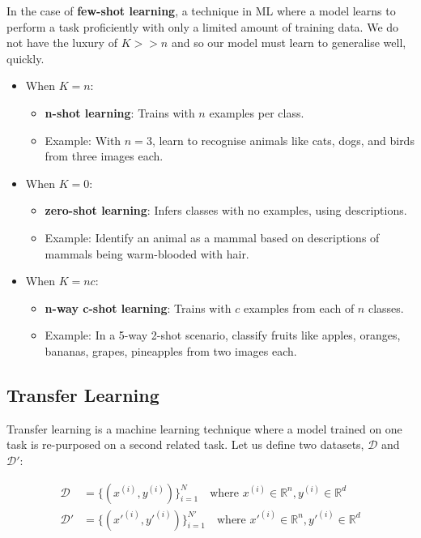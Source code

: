 In the case of \textbf{few-shot learning}, a technique in ML where a model learns to perform a task proficiently with only a limited amount of training data. We do not have the luxury of $K >> n$ and so our model must learn to generalise well, quickly. 


\begin{itemize}[noitemsep]
    \item When $K = n$:
    \begin{itemize}[noitemsep]
        \item \textbf{n-shot learning}: Trains with $n$ examples per class.
        \item Example: With $n=3$, learn to recognise animals like cats, dogs, and birds from three images each.
    \end{itemize}
    \item When $K = 0$:
    \begin{itemize}[noitemsep]
        \item \textbf{zero-shot learning}: Infers classes with no examples, using descriptions.
        \item Example: Identify an animal as a mammal based on descriptions of mammals being warm-blooded with hair.
    \end{itemize}
    \item When $K = nc$:
    \begin{itemize}[noitemsep]
        \item \textbf{n-way c-shot learning}: Trains with $c$ examples from each of $n$ classes.
        \item Example: In a 5-way 2-shot scenario, classify fruits like apples, oranges, bananas, grapes, pineapples from two images each.
    \end{itemize}
\end{itemize}


\subsection{Transfer Learning}

Transfer learning is a machine learning technique where a model trained on one task is re-purposed on a second related task. Let us define two datasets, $\mathcal{D}$ and $\mathcal{D}'$:

\begin{align}
    \mathcal{D} &= \{(x^{(i)}, y^{(i)})\}_{i=1}^N \quad \text{where } x^{(i)} \in \mathbb{R}^n, y^{(i)} \in \mathbb{R}^d \\
    \mathcal{D}' &= \{(x'^{(i)}, y'^{(i)})\}_{i=1}^{N'} \quad \text{where } x'^{(i)} \in \mathbb{R}^n, y'^{(i)} \in \mathbb{R}^d
\end{align}

